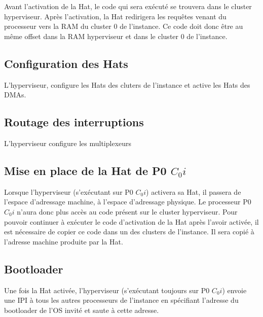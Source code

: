 \documentclass[8pt]{article}
\begin{document}
Avant l'activation de la Hat, le code qui sera exécuté se trouvera dans le cluster hyperviseur. Après l'activation, la Hat redirigera les requêtes venant du processeur vers la RAM du cluster 0 de l'instance.
Ce code doit donc être au même offset dans la RAM hyperviseur et dans le cluster 0 de l'instance. 

\subsection*{Configuration des Hats}

L'hyperviseur, configure les Hats des cluters de l'instance et active les Hats des DMAs.

\subsection*{Routage des interruptions}

L'hyperviseur configure les multiplexeurs

\subsection*{Mise en place de la Hat de P0 $C_0i$}

Lorsque l'hyperviseur (s'exécutant sur P0 $C_0i$) activera sa Hat, il passera de l'espace d'adressage machine, à l'espace d'adressage physique. Le processeur P0 $C_0i$ n'aura donc plus accès au code présent sur le cluster hyperviseur. Pour pouvoir continuer à exécuter le code d'activation de la Hat après l'avoir activée, il est nécessaire de copier ce code dans un des clusters de l'instance. Il sera copié à l'adresse machine produite par la Hat. 


\subsection*{Bootloader}
Une fois la Hat activée, l'hyperviseur (s'exécutant toujours sur P0 $C_0i$) envoie une IPI à tous les autres processeurs de l'instance en spécifiant l'adresse du bootloader de l'OS invité et saute à cette adresse.
\end{document}
